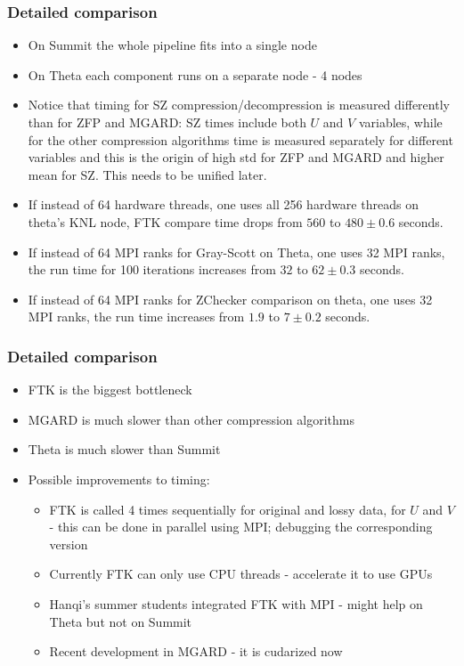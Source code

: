\begin{frame}[fragile]
  \frametitle{Detailed comparison}

  \begin{itemize}
  \item On Summit the whole pipeline fits into a single node
  \item On Theta each component runs on a separate node - 4 nodes

  \item Notice that timing for SZ compression/decompression is measured differently than for ZFP and MGARD:
    SZ times include both $U$ and $V$ variables, while for the other compression algorithms time is measured separately
    for different variables and this is the origin of high std for ZFP and MGARD and higher mean for SZ. This needs to be unified later.

  \item If instead of 64 hardware threads, one uses all 256 hardware threads on theta's KNL node,
    FTK compare time drops from $560$ to $480 \pm 0.6$ seconds.
  \item  If instead of 64 MPI ranks for Gray-Scott on Theta, one uses 32 MPI ranks,
    the run time for 100 iterations increases from $32$ to $62 \pm 0.3$ seconds.

  \item If instead of 64 MPI ranks for ZChecker comparison on theta, one uses 32 MPI ranks,
    the run time increases from $1.9$ to $7 \pm 0.2$ seconds.
  \end{itemize}
\end{frame}


\begin{frame}[fragile]
  \frametitle{Detailed comparison}
  \begin{itemize}
  \item FTK is the biggest bottleneck
  \item MGARD is much slower than other compression algorithms
  \item Theta is much slower than Summit
  \item Possible improvements to timing:
    \begin{itemize}
    \item FTK is called 4 times sequentially for original and lossy data, for $U$ and $V$ - this can be done in parallel using MPI;
      debugging the corresponding version
    \item Currently FTK can only use CPU threads - accelerate it to use GPUs
    \item Hanqi's summer students integrated FTK with MPI - might help on Theta but not on Summit
    \item Recent development in MGARD - it is cudarized now
    \end{itemize}
  \end{itemize}
\end{frame}
